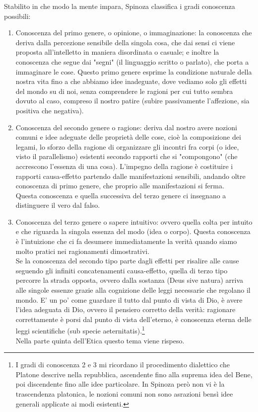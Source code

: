 Stabilito in che modo la mente impara, Spinoza classifica i gradi conoscenza possibili:
\begin{enumerate}
	\item Conoscenza del primo genere, o opinione, o immaginazione: la conoscenza che deriva dalla percezione sensibile della singola cosa, che dai sensi ci viene proposta all’intelletto in maniera disordinata o casuale; e inoltre la conoscenza che segue dai "segni" (il linguaggio scritto o parlato), che porta a immaginare le cose. Questo primo genere esprime la condizione naturale della nostra vita fino a che abbiamo idee inadeguate, dove vediamo solo gli effetti del mondo su di noi, senza comprendere le ragioni per cui tutto sembra dovuto al caso, compreso il nostro patire (subire passivamente l'affezione, sia positiva che negativa).
	\item Conoscenza del secondo genere o ragione: deriva dal nostro avere nozioni comuni e idee adeguate delle proprietà delle cose, cioè la composizione dei legami, lo sforzo della ragione di organizzare gli incontri fra corpi (o idee, visto il parallelismo) esistenti secondo rapporti che si "compongono" (che accrescono l'essenza di una cosa). L'impegno della ragione è costituire i rapporti causa-effetto partendo dalle manifestazioni sensibili, andando oltre  conoscenza di primo genere, che proprio alle manifestazioni si ferma.\\
	Questa conoscenza e quella successiva del terzo genere ci insegnano a distinguere il vero dal falso.
	\item Conoscenza del terzo genere o sapere intuitivo: ovvero quella colta per intuito e che riguarda la singola essenza del modo (idea o corpo). Questa conoscenza è l'intuizione che ci fa desumere immediatamente la verità quando siamo molto pratici nei ragionamenti dimostrativi.\\
	Se la conoscenza del secondo tipo parte dagli effetti per risalire alle cause seguendo gli infiniti concatenamenti causa-effetto, quella di terzo tipo percorre la strada opposta, ovvero dalla sostanza (Deus sive natura) arriva alle singole essenze grazie alla cognizione delle leggi necessarie che regolano il mondo. E' un po' come guardare il tutto dal punto di vista di Dio, è avere l'idea adeguata di Dio, ovvero il pensiero corretto della verità: ragionare correttamente è porsi dal punto di vista dell'eterno, è conoscenza eterna delle leggi scientifiche (sub specie aeternitatis).\footnote{I gradi di conoscenza 2 e 3 mi ricordano il procedimento dialettico che Platone descrive nella repubblica, ascendente fino alla suprema idea del Bene, poi discendente fino alle idee particolare. In Spinoza però non vi è la trascendenza platonica, le nozioni comuni non sono asrazioni bensì idee generali applicate ai modi esistenti.}\\
	Nella parte quinta dell'Etica questo tema viene rispeso.
\end{enumerate}

